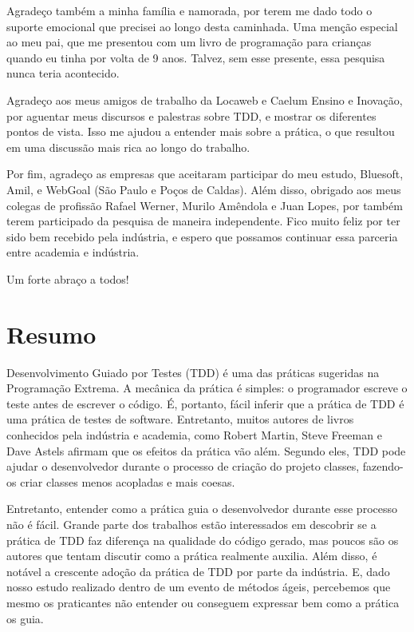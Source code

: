 \documentclass[11pt,openany,twoside,a4paper]{book}
\begin{document}
Agradeço também a minha família e namorada, por terem me dado todo o suporte
emocional que precisei ao longo desta caminhada. Uma menção especial ao meu pai,
que me presentou com um livro de programação para crianças quando eu tinha por volta
de 9 anos. Talvez, sem esse presente, essa pesquisa nunca teria acontecido.

Agradeço aos meus amigos de trabalho da Locaweb e Caelum Ensino e Inovação, 
por aguentar meus discursos e palestras sobre TDD, e mostrar os diferentes
pontos de vista. Isso me ajudou a entender mais sobre a prática, o que resultou
em uma discussão mais rica ao longo do trabalho.

Por fim, agradeço as empresas que aceitaram participar do meu estudo, Bluesoft,
Amil, e WebGoal (São Paulo e Poços de Caldas). Além disso, obrigado aos meus colegas
de profissão Rafael Werner, Murilo Amêndola e Juan Lopes, por também terem
participado da pesquisa de maneira independente. Fico muito feliz por ter sido
bem recebido pela indústria, e espero que possamos continuar essa parceria entre
academia e indústria.

Um forte abraço a todos!

\chapter*{Resumo}

Desenvolvimento Guiado por Testes (TDD) é uma das práticas sugeridas na Programação
Extrema. A mecânica da prática é simples: o programador escreve o teste antes
de escrever o código. É, portanto, fácil inferir que a prática de TDD é uma
prática de testes de software. Entretanto, muitos autores de livros 
conhecidos pela indústria e academia, como Robert Martin, Steve Freeman e 
Dave Astels afirmam que os efeitos da prática vão além. Segundo eles,
TDD pode ajudar o desenvolvedor durante o processo de criação do projeto classes,
fazendo-os criar classes menos acopladas e mais coesas.

Entretanto, entender como a prática guia o desenvolvedor durante esse processo
não é fácil. Grande parte dos trabalhos estão interessados em descobrir se
a prática de TDD faz diferença na qualidade do código gerado, mas poucos são os 
autores que tentam discutir como a prática realmente auxilia.
Além disso, é notável a crescente adoção da prática de TDD por parte da indústria. E,
dado nosso estudo realizado dentro de um evento de métodos ágeis, percebemos que
mesmo os praticantes não entender ou conseguem expressar bem como a prática
os guia.
\end{document}
